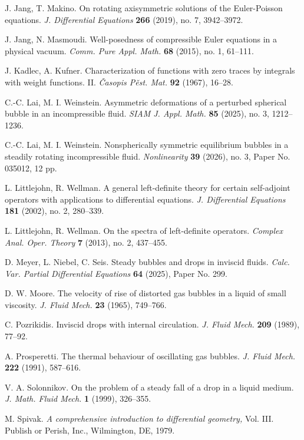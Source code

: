 \documentclass[11pt,reqno]{amsart}
\numberwithin{equation}{section}
\begin{document}
\begin{thebibliography}{}
 J. Jang, T. Makino. On rotating axisymmetric solutions of the Euler-Poisson equations. \emph{J. Differential Equations} \textbf{266} (2019), no. 7, 3942--3972.

 J. Jang, N. Masmoudi. Well-posedness of compressible Euler equations in a physical vacuum. \emph{Comm. Pure Appl. Math.} \textbf{68} (2015), no. 1, 61--111. 

 
  J. Kadlec, A. Kufner. Characterization of functions with zero traces by integrals with weight functions. II. \emph{Časopis Pěst. Mat.} \textbf{92} (1967), 16--28.
 

  C.-C. Lai, M. I. Weinstein. Asymmetric deformations of a perturbed spherical bubble in an incompressible fluid. \emph{SIAM J. Appl. Math.} \textbf{85} (2025), no. 3, 1212--1236. 
 
   C.-C. Lai, M. I. Weinstein. Nonspherically symmetric equilibrium bubbles in a steadily rotating incompressible fluid.  \emph{Nonlinearity} \textbf{39} (2026), no. 3, Paper No. 035012, 12 pp.
  
  L. Littlejohn, R. Wellman. A general left-definite theory for certain self-adjoint operators with applications to differential equations. \emph{J. Differential Equations} \textbf{181} (2002), no. 2, 280--339.
 
  L. Littlejohn, R. Wellman. On the spectra of left-definite operators. \emph{Complex Anal. Oper. Theory} \textbf{7} (2013), no. 2, 437--455. 

 D. Meyer, L. Niebel, C. Seis. Steady bubbles and drops in inviscid fluids. \emph{Calc. Var. Partial Differential Equations} \textbf{64} (2025), Paper No. 299.

 D. W. Moore. The velocity of rise of distorted gas bubbles in a liquid of small viscosity. \emph{J. Fluid Mech.} \textbf{23} (1965), 749--766.
 
  C. Pozrikidis. Inviscid drops with internal circulation. \emph{J. Fluid Mech.} \textbf{209} (1989), 77--92.

 
 A. Prosperetti. The thermal behaviour of oscillating gas bubbles. \emph{J. Fluid Mech.} \textbf{222} (1991), 587--616.

 V. A. Solonnikov. On the problem of a steady fall of a drop in a liquid medium. \emph{J. Math. Fluid Mech.} \textbf{1} (1999), 326--355.

 M. Spivak. \emph{A comprehensive introduction to differential geometry,} Vol. III. Publish or Perish, Inc., Wilmington, DE, 1979. 
 


\end{thebibliography}
\end{document}
